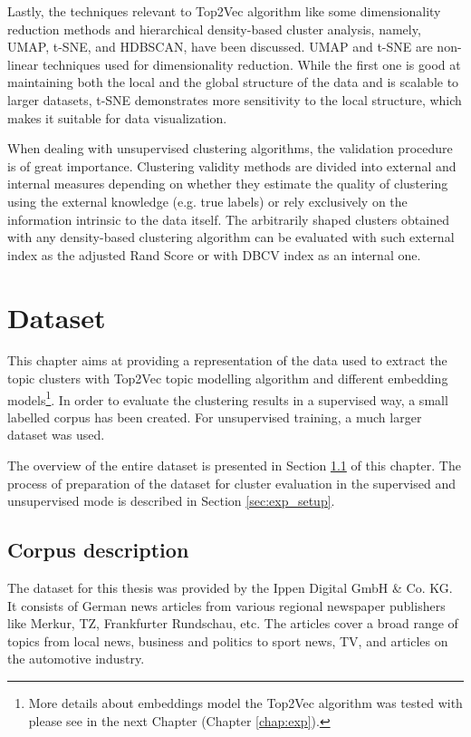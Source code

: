 \documentclass[fontsize=12pt,a4paper,twoside,openany]{scrbook}
\begin{document}
Lastly, the techniques relevant to Top2Vec algorithm like some dimensionality reduction methods and hierarchical density-based cluster analysis, namely,  UMAP, t-SNE, and HDBSCAN, have been discussed. UMAP and t-SNE are non-linear techniques used for dimensionality reduction. While the first one is good at maintaining both the local and the global structure of the data and is scalable to larger datasets, t-SNE demonstrates more sensitivity to the local structure, which makes it suitable for data visualization. 

When dealing with unsupervised clustering algorithms, the validation procedure is of great importance. Clustering validity methods are divided into external and internal measures depending on whether they estimate the quality of clustering using the external knowledge (e.g. true labels) or rely exclusively on the information intrinsic to the data itself. The arbitrarily shaped clusters obtained with any density-based clustering algorithm can be evaluated with such external index as the adjusted Rand Score or with DBCV index as an internal one.

\chapter{Dataset}
\label{chap:dataset}
This chapter aims at providing a representation of the data used to extract the topic clusters with Top2Vec topic modelling algorithm and different embedding models\footnote{More details about embeddings model the Top2Vec algorithm was tested with please see in the next Chapter (Chapter \ref{chap:exp}).}. In order to evaluate the clustering results in a supervised way, a small labelled corpus has been created. For unsupervised training, a much larger dataset was used. 

The overview of the entire dataset is presented in Section \ref{sec:corp_exploration} of this chapter. The process of preparation of the dataset for cluster evaluation in the supervised and unsupervised mode is described in Section \ref{sec:exp_setup}.

\section{Corpus description}
\label{sec:corp_exploration}

The dataset for this thesis was provided by the Ippen Digital GmbH \& Co. KG. It consists of German news articles from various regional newspaper publishers like Merkur, TZ, Frankfurter Rundschau, etc. The articles cover a broad range of topics from local news, business and politics to sport news, TV, and articles on the automotive industry.
\end{document}
